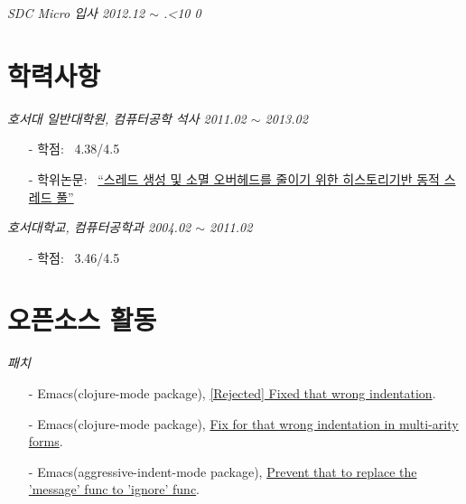 \documentclass[line,margin]{res}
\renewcommand{\today}{\number\year.\ifnum\number\month<10 0\fi \number\month}
\begin{document}
\begin{resume}
  {\sl SDC Micro 입사 \hfill 2012.12 $\sim$ \today}
  \vspace{0mm}


  \section{학력사항}

  {\sl 호서대 일반대학원, 컴퓨터공학 석사 \hfill 2011.02 $\sim$ 2013.02}
  \vspace{-4mm}
  {
    \small
    \begin{itemize}
    \item[-] 학점: ~4.38/4.5 \vspace{-1mm}
    \item[-] 학위논문: ~\href{http://dlibrary.hoseo.ac.kr/search/DetailView.ax?sid=4&cid=950591}
      {``스레드 생성 및 소멸 오버헤드를 줄이기 위한 히스토리기반 동적 스레드 풀''}
    \end{itemize}
  }

  {\sl 호서대학교, 컴퓨터공학과 \hfill 2004.02 $\sim$ 2011.02}
  \vspace{-4mm}
  {
    \small
    \begin{itemize}
    \item[-] 학점: ~3.46/4.5
    \end{itemize}
  }


  \section{오픈소스 활동}

  {\sl 패치}
  \vspace{-4mm}
  {
    \small
    \begin{itemize}
    \item[-] Emacs({\footnotesize clojure-mode package}),
      \href{https://github.com/clojure-emacs/clojure-mode/pull/263}
      {\textcolor[gray]{0.5}{[Rejected]} Fixed that wrong indentation}.
    \item[-] Emacs({\footnotesize clojure-mode package}),
      \href{https://github.com/clojure-emacs/clojure-mode/pull/257}
      {Fix for that wrong indentation in multi-arity forms}.
    \item[-] Emacs({\footnotesize aggressive-indent-mode package}),
      \href{https://github.com/Bruce-Connor/aggressive-indent-mode/pull/30}
      {Prevent that to replace the 'message' func to 'ignore' func}.
    \end{itemize}
  }


\end{resume}
\end{document}
